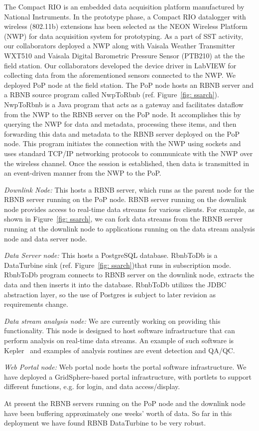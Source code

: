 The Compact RIO is an embedded data acquisition platform manufactured by National Instruments.
In the prototype phase, a Compact RIO datalogger with wireless (802.11b) extensions has been selected as the NEON Wireless Platform (NWP) for  data acquisition system for prototyping. As a part of SST activity, our collaborators deployed a NWP along with Vaisala Weather Transmitter WXT510 and Vaisala Digital Barometric Pressure Sensor (PTB210) at the the field station. Our collaborators 
developed the device driver in LabVIEW for collecting data from the aforementioned sensors connected to the NWP. We deployed PoP node  at the field station. The PoP node hosts an RBNB server and a RBNB source program called NwpToRbnb (ref. Figure~\ref{fig: ssarch}). NwpToRbnb is a Java program that acts as a gateway and facilitates dataflow from the NWP to the RBNB server on the PoP node. It accomplishes this by querying the NWP for data and metadata, processing these items, and then forwarding this data and metadata to the RBNB server deployed on the PoP node. This program initiates the connection with the NWP using sockets and uses standard TCP/IP networking protocols to communicate with the NWP over the wireless channel. Once the session is established, then data is transmitted in an event-driven manner from the NWP to the PoP. 

\emph{Downlink Node:} This 
hosts a RBNB server, which runs as the parent node for the RBNB server running on the PoP node. RBNB server running on the downlink node provides access to real-time data streams for various clients. For example, as shown in Figure~\ref{fig: ssarch}, we can fork data streams from the RBNB server running at the downlink node to applications running on the data stream analysis node and data server node.
	
\emph{Data Server node:} This hosts a PostgreSQL database. RbnbToDb is a DataTurbine sink (ref. Figure~\ref{fig: ssarch})that runs in subscription mode. RbnbToDb program connects to RBNB server on the downlink node, extracts the data and then inserts it into the database. RbnbToDb utilizes the JDBC abstraction layer, so the use of Postgres is subject to later revision as requirements change.

\emph{Data stream analysis node:}
 We are currently working on providing this functionality. This node is designed to host software infrastructure that can perform analysis on real-time data streams. An example of such software is Kepler~\cite{kepler} and examples of analysis routines are event detection and QA/QC.
 
\emph{Web Portal node:}
Web portal node hosts the portal software infrastructure. We have deployed a GridSphere-based portal infrastructure, with portlets to support different functions, e.g. for login, and data access/display.

At present the RBNB servers running on the PoP node and the downlink node have been
buffering approximately  one weeks' worth of data. So far in this deployment we have found RBNB DataTurbine to be very robust.
